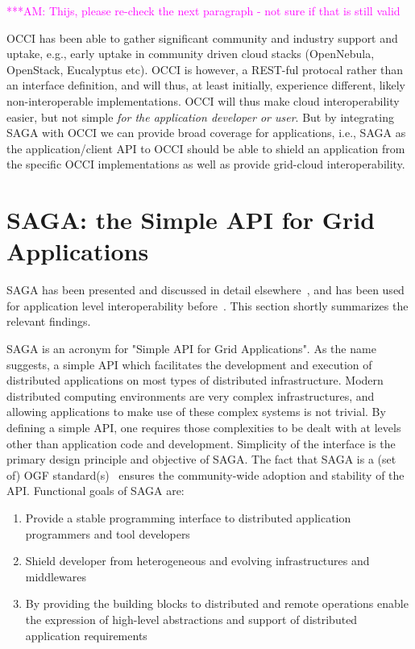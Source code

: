 \documentclass[10pt,conference,final,letterpaper,twoside,twocolumn,]{IEEEtran}
\newcommand{\amnote}[1]{  {\textcolor{magenta} {***AM: #1}}}
\newcommand{\amnote}[1]{}
\begin{document}
 \amnote{Thijs, please re-check the next paragraph - not sure if that
 is still valid}

 OCCI has been able to gather significant community and industry
 support and uptake, e.g., early uptake in community driven cloud
 stacks (OpenNebula, OpenStack, Eucalyptus etc).  OCCI is however, a
 REST-ful protocal rather than an interface definition, and will thus,
 at least initially, experience different, likely non-interoperable
 implementations.  OCCI will thus make cloud interoperability easier,
 but not simple {\it for the application developer or user}.  But by
 integrating SAGA with OCCI we can provide broad coverage for
 applications, i.e., SAGA as the application/client API to OCCI should
 be able to shield an application from the specific OCCI
 implementations as well as provide grid-cloud interoperability.


\section{SAGA: the Simple API for Grid Applications}
\label{sec:saga}

 SAGA has been presented and discussed in detail
 elsewhere~\cite{sagapub...}, and has been used for application level
 interoperability before~\cite{sagainterop...}.  This section shortly
 summarizes the relevant findings.

 SAGA is an acronym for "Simple API for Grid Applications". As the
 name suggests, a simple API which facilitates the development and
 execution of distributed applications on most types of distributed
 infrastructure.  Modern distributed computing environments are very
 complex infrastructures, and allowing applications to make use of
 these complex systems is not trivial.  By defining a simple API, one
 requires those complexities to be dealt with at levels other than
 application code and development.  Simplicity of the interface is the
 primary design principle and objective of SAGA.  The fact that SAGA
 is a (set of) OGF standard(s)~\cite{sagaspecs...} ensures the
 community-wide adoption and stability of the API.  Functional goals
 of SAGA are:

 \begin{enumerate}

  \item Provide a stable programming interface to distributed
  application programmers and tool developers
 
  \item Shield developer from heterogeneous and evolving
  infrastructures and middlewares

  \item By providing the building blocks to distributed and remote
  operations enable the expression of high-level abstractions and
  support of distributed application requirements

 \end{enumerate}
\end{document}
